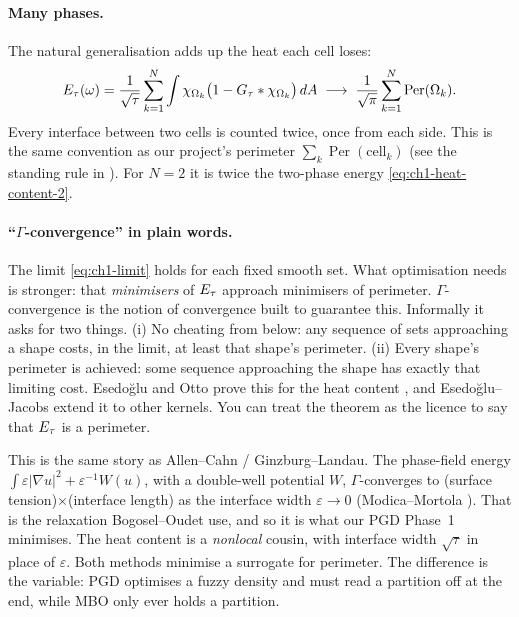 \paragraph{Many phases.}
The natural generalisation adds up the heat each cell loses:
\begin{equation}
  E_\tau(\omega) = \frac{1}{\sqrt\tau} \sum_{k=1}^N \int \chi_{\Omega_k}
      \bigl(1 - G_\tau * \chi_{\Omega_k}\bigr)\, dA
  \;\longrightarrow\; \frac{1}{\sqrt\pi}\sum_{k=1}^N \operatorname{Per}(\Omega_k).
  \label{eq:ch1-heat-content-N}
\end{equation}
Every interface between two cells is counted twice, once from each side. This is
the same convention as our project's perimeter $\sum_k \operatorname{Per}(\text{cell}_k)$
(see the standing rule in ). For $N = 2$ it is twice the
two-phase energy \eqref{eq:ch1-heat-content-2}.

\paragraph{``$\Gamma$-convergence'' in plain words.}
The limit \eqref{eq:ch1-limit} holds for each fixed smooth set. What
optimisation needs is stronger: that \emph{minimisers} of $E_\tau$ approach
minimisers of perimeter. $\Gamma$-convergence is the notion of convergence
built to guarantee this. Informally it asks for two things. (i) No cheating from
below: any sequence of sets approaching a shape costs, in the limit, at least
that shape's perimeter. (ii) Every shape's perimeter is achieved: some sequence
approaching the shape has exactly that limiting cost. Esedo\u{g}lu and Otto prove
this for the heat content \cite[App.~A]{esedoglu2015threshold}, and
Esedo\u{g}lu--Jacobs \cite{esedoglu2017kernels} extend it to other kernels. You
can treat the theorem as the licence to say that $E_\tau$ is a perimeter.

\begin{physics}
This is the same story as Allen--Cahn / Ginzburg--Landau. The phase-field energy
$\int \varepsilon|\nabla u|^2 + \varepsilon^{-1}W(u)$, with a double-well potential
$W$, $\Gamma$-converges to (surface tension)$\times$(interface length) as the
interface width $\varepsilon \to 0$ (Modica--Mortola \cite{modica1987gradient}). That is the
relaxation Bogosel--Oudet use, and so it is what our PGD Phase~1 minimises. The
heat content is a \emph{nonlocal} cousin, with interface width $\sqrt\tau$ in
place of $\varepsilon$. Both methods minimise a surrogate for perimeter. The
difference is the variable: PGD optimises a fuzzy density and must read a
partition off at the end, while MBO only ever holds a partition.
\end{physics}

